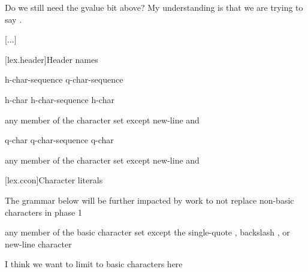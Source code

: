 \documentclass{wg21}
\begin{document}
\begin{quoteblock}
Do we still need the gvalue bit above? My understanding is that we are trying to say .
\end{quoteblock}

[...]



[lex.header]{Header names}

%
\begin{bnf}
    \br
    \terminal{<} h-char-sequence \terminal{>}\br
     q-char-sequence 
\end{bnf}

\begin{bnf}
    \br
    h-char\br
    h-char-sequence h-char
\end{bnf}

\begin{bnf}
    \br
    \textnormal{any member of the  character set except new-line and \terminal{>}}
\end{bnf}

\begin{bnf}
    \br
    q-char\br
    q-char-sequence q-char
\end{bnf}

\begin{bnf}
    \br
    \textnormal{any member of the  character set except new-line and }
\end{bnf}


[lex.ccon]{Character literals}

\begin{quoteblock}
The grammar below will be further impacted by work to not replace non-basic characters in phase 1
\end{quoteblock}

\begin{bnf}
\br
\textnormal{any member of the basic  character set except the single-quote , backslash \terminal{\textbackslash}, or new-line character}
\end{bnf}


\begin{quoteblock}
I think we want to limit to basic characters here
\end{quoteblock}
\end{document}
